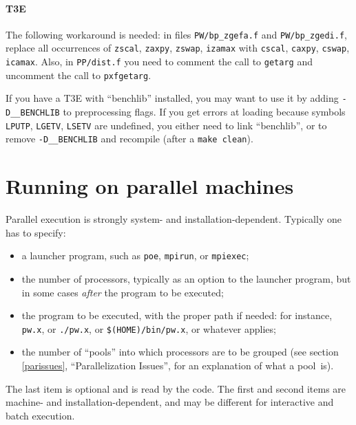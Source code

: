 \documentclass[12pt,a4paper]{article}
\begin{document}
\paragraph{T3E}

The following workaround is needed: in files \texttt{PW/bp\_zgefa.f}
and \texttt{PW/bp\_zgedi.f}, replace all occurrences of
\texttt{zscal}, \texttt{zaxpy}, \texttt{zswap}, \texttt{izamax} with
\texttt{cscal}, \texttt{caxpy}, \texttt{cswap}, \texttt{icamax}.
Also, in \texttt{PP/dist.f} you need to comment the call to
\texttt{getarg} and uncomment the call to \texttt{pxfgetarg}.

If you have a T3E with ``benchlib'' installed, you may want to use it
by adding \texttt{-D\_\_BENCHLIB} to preprocessing flags.
If you get errors at loading because symbols \texttt{LPUTP},
\texttt{LGETV}, \texttt{LSETV} are undefined, you either need to link
``benchlib'', or to remove \texttt{-D\_\_BENCHLIB} and recompile
(after a \texttt{make clean}).

\clearpage

\section{Running on parallel machines}
  \label{runparallel}

Parallel execution is strongly system- and installation-dependent.
Typically one has to specify:

\begin{itemize}
  \item a launcher program, such as \texttt{poe}, \texttt{mpirun}, or
        \texttt{mpiexec};
  \item the number of processors, typically as an option to the
        launcher program, but in some cases \emph{after} the program
        to be executed;
  \item the program to be executed, with the proper path if needed:
        for instance, \texttt{pw.x}, or \texttt{./pw.x}, or
        \texttt{\$(HOME)/bin/pw.x}, or whatever applies;
  \item the number of ``pools'' into which processors are to be
        grouped (see section \ref{parissues}, ``Parallelization
        Issues'', for an explanation of what a pool~is).
\end{itemize}

The last item is optional and is read by the code.
The first and second items are machine- and installation-dependent,
and may be different for interactive and batch execution.
\end{document}
